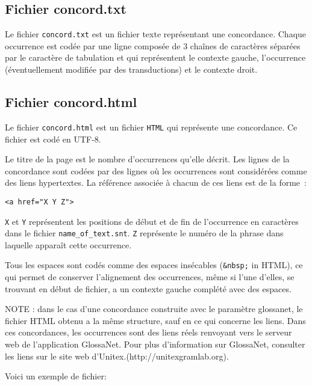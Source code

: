 \subsection{Fichier concord.txt}
Le fichier \verb+concord.txt+ est un fichier texte représentant une concordance. Chaque occurrence
est codée par une ligne composée de 3 chaînes de caractères séparées par le caractère de tabulation
et qui représentent le contexte gauche, l’occurrence (éventuellement
modifiée par des transductions) et le contexte droit.



\subsection{Fichier concord.html}
Le fichier \verb+concord.html+ est un fichier \verb+HTML+ qui représente une concordance. Ce fichier
est codé en UTF-8.

\bigskip
\noindent Le titre de la page est le nombre d’occurrences qu’elle décrit. Les lignes de la
concordance sont codées par des lignes où les occurrences sont considérées comme des liens
hypertextes. La référence associée à chacun de ces liens est de la forme~:

\medskip
\verb+<a href="X Y Z">+

\medskip
\noindent \verb+X+ et \verb+Y+ représentent les positions de début et de fin de l’occurrence en caractères
dans le fichier \verb+name_of_text.snt+. \verb+Z+ représente le numéro de la phrase dans laquelle
apparaît cette occurrence.

\bigskip
\noindent Tous les espaces sont codés comme des espaces insécables (\verb+&nbsp;+ in HTML), ce qui
permet de conserver l’alignement des occurrences, même si l’une d’elles, se trouvant en début de
fichier, a un contexte gauche complété avec des espaces.


\bigskip
\noindent NOTE : dans le cas d’une concordance construite avec le paramètre glossanet, le fichier
HTML obtenu a la même structure, sauf en ce qui concerne les liens. Dans ces concordances, les
occurrences sont des liens réels renvoyant vers le serveur web de l’application GlossaNet. Pour plus
d’information sur GlossaNet, consulter les liens sur le site web
d’Unitex.(http://unitexgramlab.org).

\bigskip
\noindent Voici un exemple de fichier:

\bigskip

